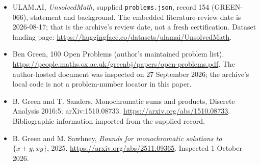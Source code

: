 \documentclass[11pt,a4paper]{article}
\begin{document}
{\small

\begin{itemize}

\item[\hypertarget{source:154:1}{S1}] ULAM.AI, \emph{UnsolvedMath}, supplied \texttt{problems.json}, record 154 (GREEN-066), statement and background. The embedded literature-review date is 2026-08-17; that is the archive’s review date, not a fresh certification. Dataset landing page: \url{https://huggingface.co/datasets/ulamai/UnsolvedMath}.

\item[\hypertarget{source:154:2}{S2}] Ben Green, 100 Open Problems (author’s maintained problem list). \url{https://people.maths.ox.ac.uk/greenbj/papers/open-problems.pdf}. The author-hosted document was inspected on 27 September 2026; the archive’s local code is not a problem-number locator in this paper.

\item[\hypertarget{source:154:3}{S3}] B. Green and T. Sanders, Monochromatic sums and products, Discrete Analysis 2016:5; arXiv:1510.08733. \url{https://arxiv.org/abs/1510.08733}. Bibliographic information imported from the supplied record.

\item[E1] B. Green and M. Sawhney, \emph{Bounds for monochromatic solutions to $\{x+y,xy\}$}, 2025. \url{https://arxiv.org/abs/2511.09365}. Inspected 1 October 2026.

\end{itemize}

}

\label{end:154}
\end{document}
